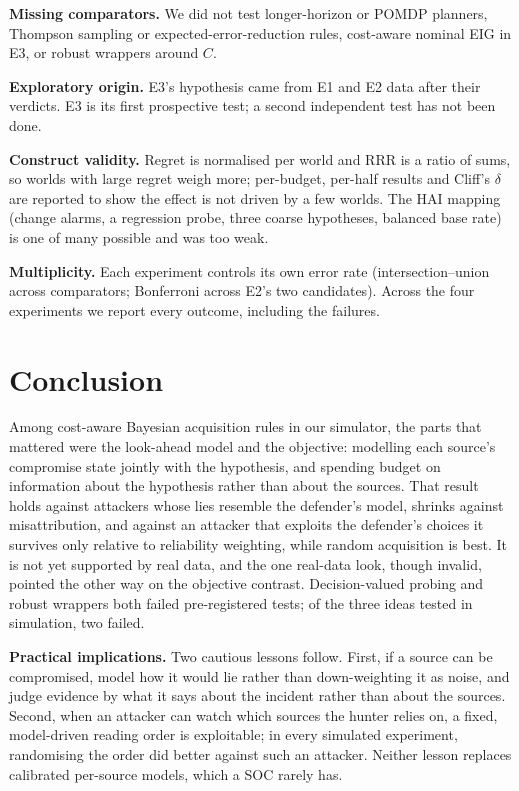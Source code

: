 \documentclass[conference]{IEEEtran}
\begin{document}
\textbf{Missing comparators.} We did not test longer-horizon or POMDP planners, Thompson sampling or
expected-error-reduction rules, cost-aware nominal EIG in E3, or robust wrappers around $C$.

\textbf{Exploratory origin.} E3's hypothesis came from E1 and E2 data after their verdicts. E3 is its first prospective
test; a second independent test has not been done.

\textbf{Construct validity.} Regret is normalised per world and RRR is a ratio of sums, so worlds with large regret
weigh more; per-budget, per-half results and Cliff's $\delta$ are reported to show the effect is not driven by a few
worlds. The HAI mapping (change alarms, a regression probe, three coarse hypotheses, balanced base rate) is one of many
possible and was too weak.

\textbf{Multiplicity.} Each experiment controls its own error rate (intersection--union across comparators; Bonferroni
across E2's two candidates). Across the four experiments we report every outcome, including the failures.

\section{Conclusion}

Among cost-aware Bayesian acquisition rules in our simulator, the parts that mattered were the look-ahead model and the
objective: modelling each source's compromise state jointly with the hypothesis, and spending budget on information
about the hypothesis rather than about the sources. That result holds against attackers whose lies resemble the
defender's model, shrinks against misattribution, and against an attacker that exploits the defender's choices it
survives only relative to reliability weighting, while random acquisition is best. It is not yet supported by real data,
and the one real-data look, though invalid, pointed the other way on the objective contrast. Decision-valued probing and
robust wrappers both failed pre-registered tests; of the three ideas tested in simulation, two failed.

\textbf{Practical implications.} Two cautious lessons follow. First, if a source can be compromised, model how it would
lie rather than down-weighting it as noise, and judge evidence by what it says about the incident rather than about the
sources. Second, when an attacker can watch which sources the hunter relies on, a fixed, model-driven reading order is
exploitable; in every simulated experiment, randomising the order did better against such an attacker. Neither lesson
replaces calibrated per-source models, which a SOC rarely has.
\end{document}
